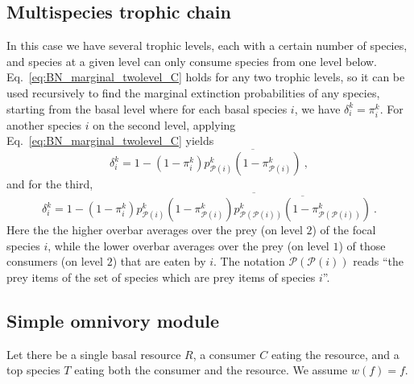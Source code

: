 \documentclass[11pt]{article}
\newcommand{\ol}[1]{\overline{#1}}
\begin{document}
\subsection{Multispecies trophic chain} \label{sec:mtc}

In this case we have several trophic levels, each with a certain number of species, and species at a given level can only consume species from one level below. Eq.~\ref{eq:BN_marginal_twolevel_C} holds for any two trophic levels, so it can be used recursively to find the marginal extinction probabilities of any species, starting from the basal level where for each basal species $i$, we have $\delta_i^k = \pi_i^k$. For another species $i$ on the second level, applying Eq.~\ref{eq:BN_marginal_twolevel_C} yields
\begin{equation}
  \label{eq:BN_mtc}
  \delta_i^k = 1 - (1 - \pi_i^k) \ol{p_{\mathcal{P}(i)}^k
    (1 - \pi_{\mathcal{P}(i)}^k)} \ ,
\end{equation}
and for the third,
\begin{equation}
  \label{eq:BN_mtc_2}
  \delta_i^k = 1 - (1 - \pi_i^k) \ol{p_{\mathcal{P}(i)}^k
    (1-\pi_{\mathcal{P}(i)}^k)\ol{p_{\mathcal{P}(\mathcal{P}(i))}^k
      (1-\pi_{\mathcal{P}(\mathcal{P}(i))}^k)}} \ .
\end{equation}
Here the the higher overbar averages over the prey (on level $2$) of the focal species $i$, while the lower overbar averages over the prey (on level $1$) of those consumers (on level $2$) that are eaten by $i$. The notation $\mathcal{P}(\mathcal{P}(i))$ reads ``the prey items of the set of species which are prey items of species $i$''.

\subsection{Simple omnivory module}

Let there be a single basal resource $R$, a consumer $C$ eating the resource, and a top species $T$ eating both the consumer and the resource. We assume $w(f)=f$.
\end{document}
